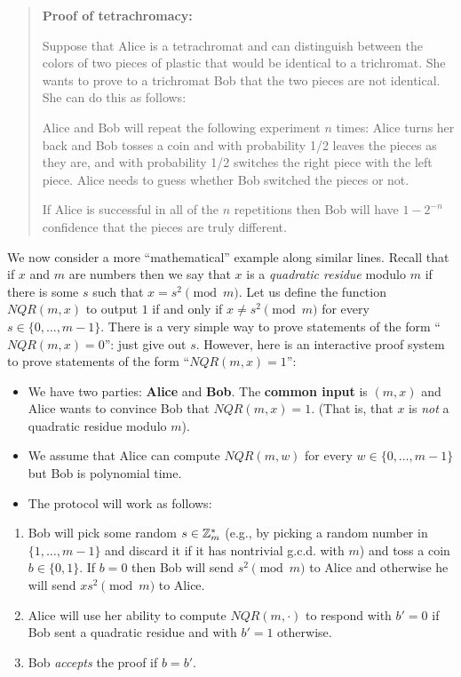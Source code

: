 \begin{quote}
\textbf{Proof of tetrachromacy:}

Suppose that Alice is a tetrachromat and can distinguish between the
colors of two pieces of plastic that would be identical to a trichromat.
She wants to prove to a trichromat Bob that the two pieces are not
identical. She can do this as follows:

Alice and Bob will repeat the following experiment \(n\) times: Alice
turns her back and Bob tosses a coin and with probability 1/2 leaves the
pieces as they are, and with probability 1/2 switches the right piece
with the left piece. Alice needs to guess whether Bob switched the
pieces or not.

If Alice is successful in all of the \(n\) repetitions then Bob will
have \(1-2^{-n}\) confidence that the pieces are truly different.
\end{quote}

We now consider a more ``mathematical'' example along similar lines.
Recall that if \(x\) and \(m\) are numbers then we say that \(x\) is a
\emph{quadratic residue} modulo \(m\) if there is some \(s\) such that
\(x=s^2 \pmod{m}\). Let us define the function
\(\ensuremath{\mathit{NQR}}(m,x)\) to output \(1\) if and only if
\(x \neq s^2 \pmod{m}\) for every \(s \in \{0,\ldots, m-1\}\). There is
a very simple way to prove statements of the form
``\(\ensuremath{\mathit{NQR}}(m,x)=0\)'': just give out \(s\). However,
here is an interactive proof system to prove statements of the form
``\(\ensuremath{\mathit{NQR}}(m,x)=1\)'':

\begin{itemize}
\item
  We have two parties: \textbf{Alice} and \textbf{Bob}. The
  \textbf{common input} is \((m,x)\) and Alice wants to convince Bob
  that \(\ensuremath{\mathit{NQR}}(m,x)=1\). (That is, that \(x\) is
  \emph{not} a quadratic residue modulo \(m\)).
\item
  We assume that Alice can compute \(\ensuremath{\mathit{NQR}}(m,w)\)
  for every \(w\in \{0,\ldots,m-1\}\) but Bob is polynomial time.
\item
  The protocol will work as follows:
\end{itemize}

\begin{enumerate}
\def\labelenumi{\arabic{enumi}.}
\item
  Bob will pick some random \(s\in {\mathbb{Z}}^*_m\) (e.g., by picking a random
  number in \(\{1,\ldots,m-1\}\) and discard it if it has nontrivial
  g.c.d. with \(m\)) and toss a coin \(b\in\{0,1\}\). If \(b=0\) then
  Bob will send \(s^2 \pmod{m}\) to Alice and otherwise he will send
  \(xs^2 \pmod{m}\) to Alice.
\item
  Alice will use her ability to compute
  \(\ensuremath{\mathit{NQR}}(m,\cdot)\) to respond with \(b'=0\) if Bob
  sent a quadratic residue and with \(b'=1\) otherwise.
\item
  Bob \emph{accepts} the proof if \(b=b'\).
\end{enumerate}

